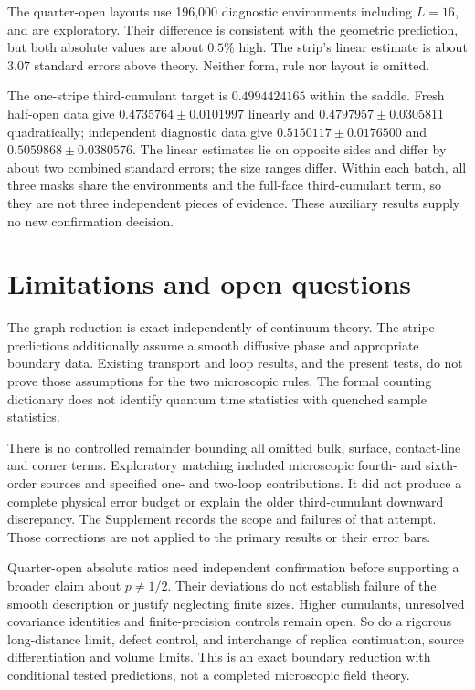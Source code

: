 \documentclass[11pt,a4paper]{article}
\begin{document}

The quarter-open layouts use 196,000 diagnostic environments including
\(L=16\), and are exploratory. Their difference is consistent with the
geometric prediction, but both absolute values are about \(0.5\%\) high.
The strip's linear estimate is about \(3.07\) standard errors above theory.
Neither form, rule nor layout is omitted.

The one-stripe third-cumulant target is \(0.4994424165\) within the saddle.
Fresh half-open data give \(0.4735764\pm0.0101997\) linearly and
\(0.4797957\pm0.0305811\) quadratically; independent diagnostic data give
\(0.5150117\pm0.0176500\) and \(0.5059868\pm0.0380576\).
The linear estimates lie on opposite sides and differ by about two
combined standard errors; the size ranges differ.
Within each batch, all three masks share the environments and the full-face
third-cumulant term, so they are not three independent pieces of evidence.
These auxiliary results supply no new confirmation decision.

\section{Limitations and open questions}
The graph reduction is exact independently of continuum theory.
The stripe predictions additionally assume a smooth diffusive phase and
appropriate boundary data. Existing transport and loop results, and the
present tests, do not prove those assumptions for the two microscopic rules.
The formal counting dictionary does not identify quantum time statistics
with quenched sample statistics.

There is no controlled remainder bounding all omitted bulk, surface,
contact-line and corner terms. Exploratory matching included microscopic
fourth- and sixth-order sources and specified one- and two-loop contributions.
It did not produce a complete physical error budget or explain the older
third-cumulant downward discrepancy. The Supplement records the scope and
failures of that attempt. Those corrections are not applied to the primary
results or their error bars.

Quarter-open absolute ratios need independent confirmation before supporting
a broader claim about \(p\ne1/2\). Their deviations do not establish failure
of the smooth description or justify neglecting finite sizes.
Higher cumulants, unresolved covariance identities and finite-precision
controls remain open. So do a rigorous long-distance limit, defect control,
and interchange of replica continuation, source differentiation and volume
limits. This is an exact boundary reduction with conditional tested
predictions, not a completed microscopic field theory.
\end{document}
